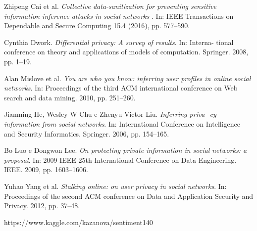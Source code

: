 \begin{thebibliography}{9}
Zhipeng Cai et al.\newline
\textit{Collective data-sanitization for preventing sensitive information inference attacks in social networks}\newline
. In: IEEE Transactions on Dependable and Secure Computing 15.4 (2016), pp. 577–590.

Cynthia Dwork.\newline
\textit{Differential privacy: A survey of results}.\newline
In: Interna- tional conference on theory and applications of models of computation. Springer. 2008, pp. 1–19.

Alan Mislove et al. \newline
\textit{You are who you know: inferring user profiles in online social networks}.\newline
In: Proceedings of the third ACM international conference on Web search and data mining. 2010, pp. 251–260.

Jianming He, Wesley W Chu e Zhenyu Victor Liu. \newline
\textit{Inferring priva- cy information from social networks}.\newline
In: International Conference on Intelligence and Security Informatics. Springer. 2006, pp. 154–165.

Bo Luo e Dongwon Lee.\newline
\textit{On protecting private information in social networks: a proposal}.\newline
In: 2009 IEEE 25th International Conference on Data Engineering. IEEE. 2009, pp. 1603–1606.

Yuhao Yang et al.\newline
\textit{Stalking online: on user privacy in social networks}.\newline
In: Proceedings of the second ACM conference on Data and Application Security and Privacy. 2012, pp. 37–48.

https://www.kaggle.com/kazanova/sentiment140
\end{thebibliography}
